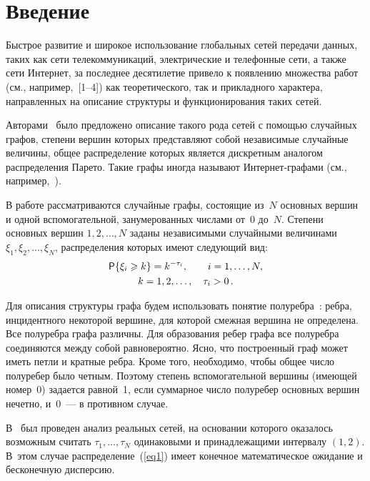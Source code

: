       \begin{multicols}{2}
      
            \label{st\stat}



\section{Введение}

Быстрое развитие и широкое использование глобальных сетей
передачи данных, таких как сети телекоммуникаций, электрические и
телефонные сети, а также сети Интернет, за последнее десятилетие
привело к появлению множества работ (см., например,~[1--4]) 
как теоретического, так и прикладного
характера, направленных на описание структуры и функционирования
таких сетей. 

Авторами~\cite{Fa} было предложено описание такого
рода сетей с помощью случайных графов, степени вершин которых
представляют собой независимые случайные величины, общее
распределение которых является дискретным аналогом распределения
Парето. Такие графы иногда называют Ин\-тер\-нет-гра\-фа\-ми (см.,
например,~\cite{Pav}).

В работе рассматриваются случайные графы, состоящие из~$N$
основных вершин и одной вспомогательной, занумерованных числами
от~0 до~$N$. Степени основных вершин $1,2,\dots,N$ заданы
независимыми случайными величинами $\xi_1,\xi_2,\dots,\xi_N$,
распределения которых имеют следующий вид:
\begin{multline}
\label{eq1}
{\sf P}\{\xi_i\geqslant k\}= k^{-\tau_i}, \qquad i=1,\dots,N, \\
k=1,2,\dots, \quad \tau_i > 0\,.
\end{multline}

Для описания структуры графа будем использовать понятие полуребра~\cite{RN}: 
ребра, инцидентного некоторой вершине, для которой
смежная вершина не определена. Все полуребра графа различны. Для
образования ребер графа все полуребра соединяются между собой
равновероятно. Ясно, что построенный граф может иметь петли и
кратные ребра. Кроме того, необходимо, чтобы общее число
полуребер было четным. Поэтому степень вспомогательной вершины
(имеющей номер~0) задается равной~1, если суммарное число
полуребер основных вершин нечетно, и~0~--- в противном случае.

В~\cite{Fa} был проведен анализ реальных сетей, на основании
которого оказалось возможным считать $\tau_1,\dots,\tau_N$
одинаковыми и принадлежащими интервалу $(1,2)$. В~этом случае
распределение~(\ref{eq1}) имеет конечное математическое ожидание
и бесконечную дисперсию.


\end{multicols}

